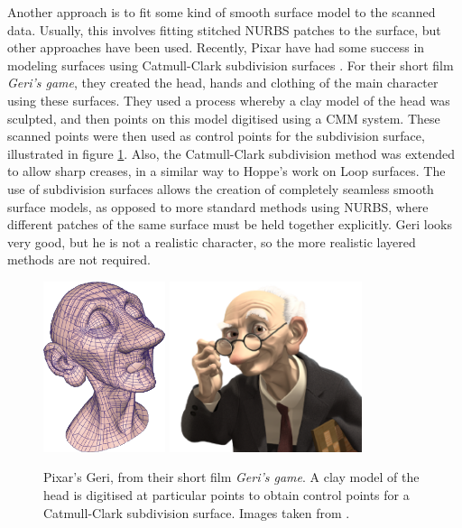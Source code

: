 \documentclass[10pt,oneside,fleqn,a4paper]{book}
\begin{document}
Another approach is to fit some kind of smooth surface model to the scanned data. Usually, this involves fitting stitched NURBS patches to the surface, but other approaches have been used. Recently, Pixar have had some success in modeling surfaces using Catmull-Clark subdivision surfaces \cite{DeRose98}. For their short film {\it Geri's game}, they created the head, hands and clothing of the main character using these surfaces. They used a process whereby a clay model of the head was sculpted, and then points on this model digitised using a CMM system. These scanned points were then used as control points for the subdivision surface, illustrated in figure {\ref{fig:geri}}. Also, the Catmull-Clark subdivision method was extended to allow sharp creases, in a similar way to Hoppe's work on Loop surfaces. The use of subdivision surfaces allows the creation of completely seamless smooth surface models, as opposed to more standard methods using NURBS, where different patches of the same surface must be held together explicitly. Geri looks very good, but he is not a realistic character, so the more realistic layered methods are not required.

\begin{figure}
\begin{center}
\includegraphics[height=5cm]{../images/geri_control}
\includegraphics[height=5cm]{../images/geri2}
\caption[Pixar's Geri]{\label{fig:geri}Pixar's Geri, from their short film {\it Geri's game}. A clay model of the head is digitised at particular points to obtain control points for a Catmull-Clark subdivision surface. Images taken from \cite{DeRose98}.}
\end{center}
\end{figure}
\end{document}
